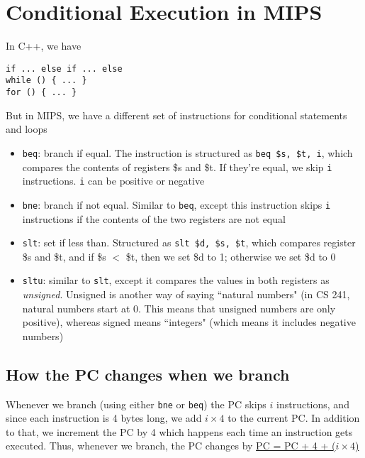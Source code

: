 \documentclass{report}
\begin{document}
\section{Conditional Execution in MIPS}
In C++, we have
\begin{lstlisting}
if ... else if ... else
while () { ... }
for () { ... }
\end{lstlisting}
But in MIPS, we have a different set of instructions for conditional statements and loops
\begin{itemize}
\item \texttt{beq}: branch if equal. The instruction is structured as \texttt{beq \$s, \$t, i}, which compares the contents of registers \$s and \$t. If they're equal, we skip \texttt{i} instructions. \texttt{i} can be positive or negative
\item \texttt{bne}: branch if not equal. Similar to \texttt{beq}, except this instruction skips \texttt{i} instructions if the contents of the two registers are not equal
\item \texttt{slt}: set if less than. Structured as \texttt{slt \$d, \$s, \$t}, which compares register \$s and \$t, and if \$s $<$ \$t, then we set \$d to 1; otherwise we set \$d to 0
\item \texttt{sltu}: similar to \texttt{slt}, except it compares the values in both registers as \textit{unsigned}. Unsigned is another way of saying ``natural numbers" (in CS 241, natural numbers start at 0. This means that unsigned numbers are only positive), whereas signed means ``integers" (which means it includes negative numbers)
\end{itemize}
\subsection{How the PC changes when we branch}
Whenever we branch (using either \texttt{bne} or \texttt{beq}) the PC skips $i$ instructions, and since each instruction is 4 bytes long, we add $i \times 4$ to the current PC. In addition to that, we increment the PC by 4 which happens each time an instruction gets executed. Thus, whenever we branch, the PC changes by \underline{PC = PC + 4 + ($i \times 4$)}
\end{document}
